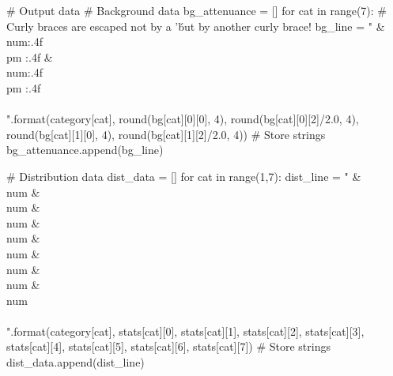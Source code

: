 \begin{pycode}
# Output data
# Background data
bg_attenuance = []
for cat in range(7):
    # Curly braces are escaped not by a '\' but by another curly brace!
    bg_line = "{} & \\num{{{:.4f} \\pm {:.4f}}} & \\num{{{:.4f} \\pm {:.4f}}} \\\\".format(category[cat], round(bg[cat][0][0], 4), round(bg[cat][0][2]/2.0, 4), round(bg[cat][1][0], 4), round(bg[cat][1][2]/2.0, 4))
    # Store strings
    bg_attenuance.append(bg_line)

# Distribution data
dist_data = []
for cat in range(1,7):
    dist_line = "{} & \\num{{{}}} & \\num{{{}}} & \\num{{{}}} & \\num{{{}}} & \\num{{{}}} & \\num{{{}}} & \\num{{{}}} & \\num{{{}}} \\\\".format(category[cat], stats[cat][0], stats[cat][1], stats[cat][2], stats[cat][3], stats[cat][4], stats[cat][5], stats[cat][6], stats[cat][7])
    # Store strings
    dist_data.append(dist_line)
\end{pycode}
